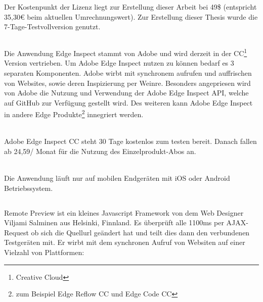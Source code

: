 	Der Kostenpunkt der Lizenz liegt zur Erstellung dieser Arbeit bei 49\$ (entspricht 35,30€ beim aktuellen Umrechnungswert). Zur 	Erstellung dieser Thesis wurde die 7-Tage-Testvollversion genutzt.
	
	\subsection{}
	Die Anwendung Edge Inspect stammt von Adobe und wird derzeit in der CC\footnote{Creative Cloud} Version vertrieben. Um 		Adobe Edge Inspect nutzen zu können bedarf es 3 separaten Komponenten. Adobe wirbt mit synchronem aufrufen und 			auffrischen von Websites, sowie deren Inspizierung per Weinre. Besonders angepriesen wird von Adobe die Nutzung und 		Verwendung der Adobe Edge Inspect API, welche auf GitHub zur Verfügung gestellt wird. Des weiteren kann Adobe Edge 		Inspect in andere Edge Produkte\footnote{zum Beispiel Edge Reflow CC und Edge Code CC} innegriert werden. 
	
	\\Adobe Edge Inspect CC steht 30 Tage kostenlos zum testen bereit. Danach fallen ab 24,59/ Monat für die Nutzung des 			Einzelprodukt-Abos an.
	
	\\Die Anwendung läuft nur auf mobilen Endgeräten mit iOS oder Android Betriebssystem.
	
	\subsection{}
	Remote Preview ist ein kleines Javascript Framework von dem Web Designer Viljami Salminen aus Helsinki, Finnland. Es 		überprüft alle 1100ms per AJAX-Request ob sich die Quellurl geändert hat und teilt dies dann den verbundenen Testgeräten mit. 	Er wirbt mit dem synchronen Aufruf von Websiten auf einer Vielzahl von Plattformen: 
	
